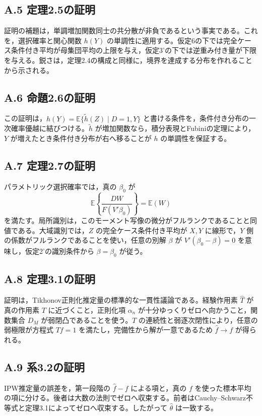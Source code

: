 \documentclass[10pt,a4paper]{article}
\newcommand{\E}{\mathbb{E}}
\begin{document}
\subsection*{A.5 定理2.5の証明}

証明の補題は，単調増加関数同士の共分散が非負であるという事実である。これを，選択確率と関心関数 $h(Y)$ の単調性に適用する。仮定6の下では完全ケース条件付き平均が母集団平均の上限を与え，仮定3'の下では逆重み付き量が下限を与える。鋭さは，定理2.4の構成と同様に，境界を達成する分布を作れることから示される。

\subsection*{A.6 命題2.6の証明}

この証明は，$h(Y)=\E\{\widetilde h(Z)\mid D=1,Y\}$ と書ける条件を，条件付き分布の一次確率優越に結びつける。$\widetilde h$ が増加関数なら，積分表現とFubiniの定理により，$Y$ が増えたとき条件付き分布が右へ移ることが $h$ の単調性を保証する。

\subsection*{A.7 定理2.7の証明}

パラメトリック選択確率では，真の $\beta_0$ が
\[
\E\left\{\frac{DW}{F(V'\beta_0)}\right\}=\E(W)
\]
を満たす。局所識別は，このモーメント写像の微分がフルランクであることと同値である。大域識別では，$Z$ の完全ケース条件付き平均が $X,Y$ に線形で，$Y$ 側の係数がフルランクであることを使い，任意の別解 $\beta$ が $V'(\beta_0-\beta)=0$ を意味し，仮定2'の識別条件から $\beta=\beta_0$ が従う。

\subsection*{A.8 定理3.1の証明}

証明は，Tikhonov正則化推定量の標準的な一貫性議論である。経験作用素 $\widehat T$ が真の作用素 $T$ に近づくこと，正則化項 $\alpha_n$ が十分ゆっくりゼロへ向かうこと，関数集合 $D_M$ が弱閉凸であることを使う。$T$ の連続性と弱逐次閉性により，任意の弱極限が方程式 $Tf=1$ を満たし，完備性から解が一意であるため $\widehat f\to f$ が得られる。

\subsection*{A.9 系3.2の証明}

IPW推定量の誤差を，第一段階の $\widehat f-f$ による項と，真の $f$ を使った標本平均の項に分ける。後者は大数の法則でゼロへ収束する。前者はCauchy--Schwarz不等式と定理3.1によってゼロへ収束する。したがって $\widehat\theta$ は一致する。
\end{document}
